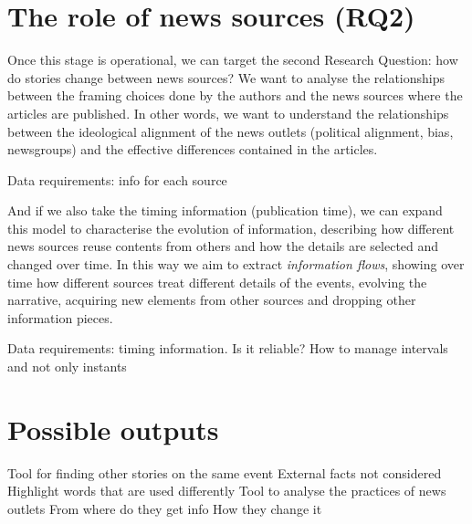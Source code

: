 \section{The role of news sources (RQ2)}
\label{sec:prop_rq2}

Once this stage is operational, we can target the second Research Question: how do stories change between news sources?
We want to analyse the relationships between the framing choices done by the authors and the news sources where the articles are published. In other words, we want to understand the relationships between the ideological alignment of the news outlets (political alignment, bias, newsgroups) and the effective differences contained in the articles.

Data requirements: info for each source




And if we also take the timing information (publication time), we can expand this model to characterise the evolution of information, describing how different news sources reuse contents from others and how the details are selected and changed over time.
In this way we aim to extract \textit{information flows}, showing over time how different sources treat different details of the events, evolving the narrative, acquiring new elements from other sources and dropping other information pieces.\textbf{}

Data requirements: timing information.
Is it reliable? How to manage intervals and not only instants




\section{Possible outputs}


Tool for finding other stories on the same event
External facts not considered
Highlight words that are used differently
Tool to analyse the practices of news outlets
From where do they get info
How they change it
